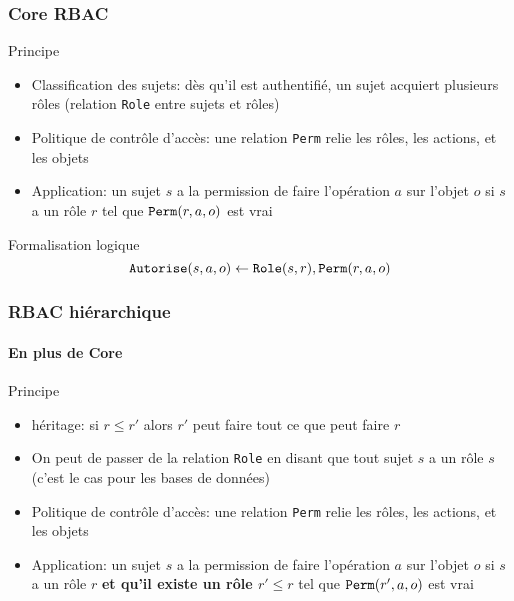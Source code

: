 \begin{reveals}
\begin{frame}
  \vfill



\end{frame}


\begin{frame}
  \frametitle{Core RBAC}

  \vfill

   \begin{block}{Principe}
     \begin{itemize}
     \item Classification des sujets: dès qu'il est authentifié, un
       sujet acquiert plusieurs rôles (relation \texttt{Role} entre
       sujets et rôles)
     \item Politique de contrôle d'accès: une relation \texttt{Perm}
       relie les rôles, les actions, et les objets
     \item Application: un sujet \(s\) a la permission de faire
       l'opération \(a\) sur l'objet \(o\) si \(s\) a un rôle \(r\)
       tel que \(\text{\tt Perm}(r,a,o)\) est vrai
     \end{itemize}
  \end{block}

  \vfill
  
  \begin{block}{Formalisation logique}
    \[
      \text{\tt Autorise}(s,a,o) \leftarrow \text{\tt Role}(s,r),\text{\tt Perm}(r,a,o)
    \]
  \end{block}

  \vfill
\end{frame}

\begin{frame}
  \frametitle{RBAC hiérarchique}
  \framesubtitle{En plus de Core}

  \vfill

   \begin{block}{Principe}
     \begin{itemize}
     \item héritage: si \(r \le r'\) alors \(r'\) peut faire tout ce que peut faire \(r\)
     \item On peut de passer de la relation \texttt{Role} en disant
       que tout sujet \(s\) a un rôle \(s\) (c'est le cas pour les bases de données)
     \item Politique de contrôle d'accès: une relation \texttt{Perm}
       relie les rôles, les actions, et les objets
     \item Application: un sujet \(s\) a la permission de faire
       l'opération \(a\) sur l'objet \(o\) si \(s\) a un rôle \(r\)
       \textbf{et qu'il existe un rôle \(r'\le r\)} tel que
       \(\text{\tt Perm}(r',a,o)\) est vrai
     \end{itemize}
  \end{block}
  

\end{frame}
\end{reveals}
